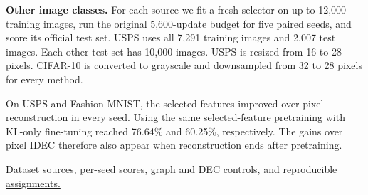\textbf{Other image classes.} For each source we fit a fresh selector on up to 12,000 training images, run the original 5,600-update budget for five paired seeds, and score its official test set. USPS uses all 7,291 training images and 2,007 test images. Each other test set has 10,000 images. USPS is resized from 16 to 28 pixels. CIFAR-10 is converted to grayscale and downsampled from 32 to 28 pixels for every method.

\begin{center}\small

\end{center}

On USPS and Fashion-MNIST, the selected features improved over pixel reconstruction in every seed. Using the same selected-feature pretraining with KL-only fine-tuning reached 76.64\% and 60.25\%, respectively. The gains over pixel IDEC therefore also appear when reconstruction ends after pretraining.

\href{https://github.com/JohnR31N/cs126FinalProj/tree/main/IDEC/external_benchmarks}{Dataset sources, per-seed scores, graph and DEC controls, and reproducible assignments.}
